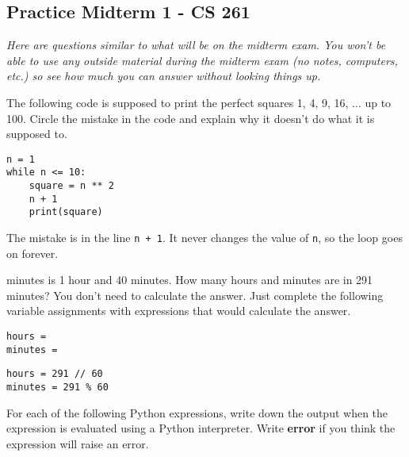 \documentclass[12pt,answers]{exam}
\begin{document}
\pagestyle{empty}
\graphicspath{{/home/brian/Dropbox/HSC/Spring16/Math111/}}

\subsection*{Practice Midterm 1 - CS 261}
\textit{Here are questions similar to what will be on the midterm exam.  You won't be able to use any outside material during the midterm exam (no notes, computers, etc.) so see how much you can answer without looking things up.}

\begin{questions}

\question The following code is supposed to print the perfect squares 1, 4, 9, 16, $\ldots$ up to 100.  Circle the mistake in the code and explain why it doesn't do what it is supposed to. 
\lstset{language=Python}
\lstset{columns=fixed}
\begin{lstlisting}
n = 1
while n <= 10:
    square = n ** 2
    n + 1
    print(square)
\end{lstlisting}
\begin{solution}
The mistake is in the line \lstinline{n + 1}.  It never changes the value of \lstinline{n}, so the loop goes on forever.
\end{solution}
 

 minutes is 1 hour and 40 minutes. How many hours and minutes are in 291 minutes?  You don't need to calculate the answer.  Just complete the following variable assignments with expressions that would calculate the answer.
\lstset{language=Python}
\begin{lstlisting}
hours = 
minutes = 
\end{lstlisting}
\begin{solution}
\begin{lstlisting}
hours = 291 // 60
minutes = 291 % 60
\end{lstlisting}

\end{solution}

\question For each of the following Python expressions, write down the output when the expression is evaluated using a Python interpreter. Write \textbf{error} if you think the expression will raise an error.

\end{questions}
\end{document}
